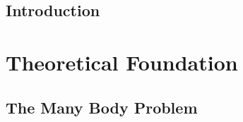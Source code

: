 \documentclass[nobib,a4paper,twoside,notoc,justified,marginals=justified]{tufte-book}
\newcommand{\blankpage}{\newpage\hbox{}\thispagestyle{empty}\newpage}
\begin{document}
\frontmatter
{}
  
%  

\tableofcontents





\cleardoublepage

 \chapter{Introduction}
 

\mainmatter
{}  %

 \part{Theoretical Foundation}

\chapter{The Many Body Problem}


% 
% 
%
%
%
% 
%
% 
%
% 
\end{document}
